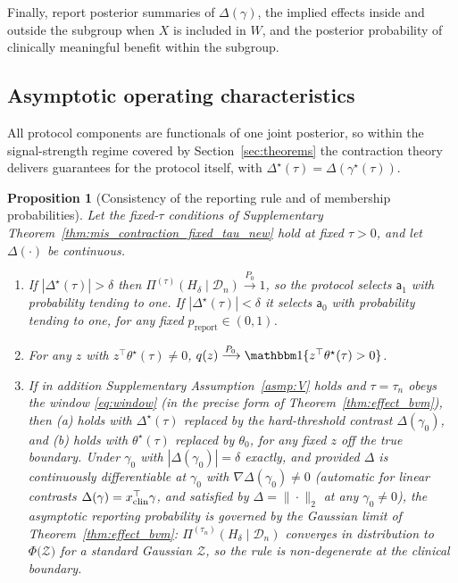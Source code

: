 \documentclass[11pt]{article}
\newtheorem{proposition}{Proposition}
\theoremstyle{definition}
\theoremstyle{plain}
\begin{document}
Finally, report posterior summaries of $\Delta(\gamma)$, the implied effects inside and outside the subgroup when $X$ is included in $W$, and the posterior probability of clinically meaningful benefit within the subgroup.

\subsection{Asymptotic operating characteristics}
\label{sec:protocol_theory}

All protocol components are functionals of one joint posterior, so within the signal-strength regime covered by Section~\ref{sec:theorems} the contraction theory delivers guarantees for the protocol itself, with $\Delta^\star(\tau)=\Delta(\gamma^\star(\tau))$.

\begin{proposition}[Consistency of the reporting rule and of membership probabilities]
\label{prop:protocol_consistency}
Let the fixed-$\tau$ conditions of Supplementary Theorem~\ref{thm:mis_contraction_fixed_tau_new} hold at fixed $\tau>0$, and let $\Delta(\cdot)$ be continuous.
\begin{enumerate}[label=(\alph*),nosep]
\item\label{prop:pc_report} If $|\Delta^\star(\tau)|>\delta$ then $\Pi^{(\tau)}(H_\delta\mid\mathcal D_n)\xrightarrow{P_0}1$, so the protocol selects $\mathsf{a}_1$ with probability tending to one. If $|\Delta^\star(\tau)|<\delta$ it selects $\mathsf{a}_0$ with probability tending to one, for any fixed $p_{\mathrm{report}}\in(0,1)$.
\item\label{prop:pc_membership} For any $z$ with $z^\top\theta^\star(\tau)\neq0$,
$q(z)\xrightarrow{P_0}\mathbbm 1\{z^\top\theta^\star(\tau)>0\}$.
\item\label{prop:pc_window} If in addition Supplementary Assumption~\ref{asmp:V} holds and $\tau=\tau_n$ obeys the window \eqref{eq:window} (in the precise form of Theorem~\ref{thm:effect_bvm}), then (a) holds with $\Delta^\star(\tau)$ replaced by the hard-threshold contrast $\Delta(\gamma_0)$, and (b) holds with $\theta^\star(\tau)$ replaced by $\theta_0$, for any fixed $z$ off the true boundary. Under $\gamma_0$ with $|\Delta(\gamma_0)|=\delta$ exactly, and provided $\Delta$ is continuously differentiable at $\gamma_0$ with $\nabla\Delta(\gamma_0)\neq0$ (automatic for linear contrasts $\Delta(\gamma)=x_{\rm clin}^\top\gamma$, and satisfied by $\Delta=\|\cdot\|_2$ at any $\gamma_0\neq0$), the asymptotic reporting probability is governed by the Gaussian limit of Theorem~\ref{thm:effect_bvm}: $\Pi^{(\tau_n)}(H_\delta\mid\mathcal D_n)$ converges in distribution to $\Phi\big(\mathcal Z\big)$ for a standard Gaussian $\mathcal Z$, so the rule is non-degenerate at the clinical boundary.
\end{enumerate}
\end{proposition}
\end{document}
